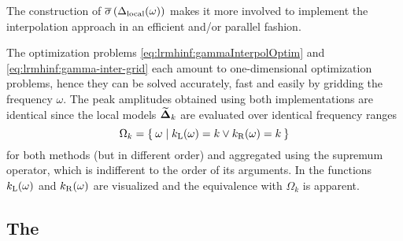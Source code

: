 \begin{remark}
The construction of $ \svdMax{\Delta_{\LMM}(\omega)}$  makes it more involved to implement the interpolation approach in an efficient and/or parallel fashion.
\end{remark}

\begin{remark}
The optimization problems \eqref{eq:lrmhinf:gammaInterpolOptim} and \eqref{eq:lrmhinf:gamma-inter-grid} each amount to one-dimensional optimization problems, hence they can be solved accurately, fast and easily by gridding the frequency $\omega$.
The peak amplitudes obtained using both implementations are identical since the local models $\LocalModel[k]{\Delta}$ are evaluated over identical frequency ranges
 \begin{equation}
  \Omega_k 
     = 
       \Set{
           \omega 
           | 
               \leftAdjacent(\omega) = k 
               \vee 
               \rightAdjacent(\omega) = k
      }
 \end{equation}
for both methods (but in different order) and aggregated using the supremum operator, which is indifferent to the order of its arguments.
In  the functions $\leftAdjacent(\omega)$ and $\rightAdjacent(\omega)$ are visualized and the equivalence with $\Omega_k$ is apparent.
\end{remark}

\subsection{The }
\label{sec:lrmhinf:LRM}


